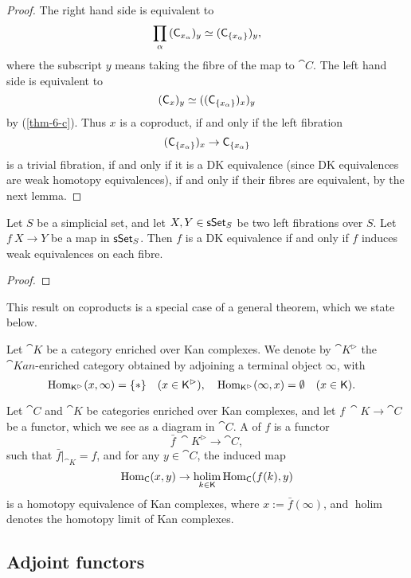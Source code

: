 \begin{proof}
    The right hand side is equivalent to  
    \[ \prod_\alpha{}(\mathsf{C}_{x_\alpha\/})_y
    \simeq (\mathsf{C}_{\{x_\alpha\}\/})_y, \]
    where the subscript $y$ means taking the fibre of the map to $\cat C$.
    The left hand side is equivalent to 
    \[ (\mathsf{C}_{x\/})_y\simeq((\mathsf{C}_{\{x_\alpha\}\/})_{x\/})_y \]
    by (\ref{thm-6-c}). Thus $x$ is a coproduct, if and only if the left fibration
    \[(\mathsf{C}_{\{x_\alpha\}\/})_{x\/}\to\mathsf{C}_{\{x_\alpha\}\/}\]
    is a trivial fibration,
    if and only if it is a DK equivalence (since DK equivalences are weak homotopy equivalences),
    if and only if their fibres are equivalent, by the next lemma.
\end{proof}

\begin{lemma}
    Let $S$ be a simplicial set, and let $X,Y\in\mathsf{sSet}_{\/S}$
    be two left fibrations over $S$.
    Let $f\:X\to Y$ be a map in $\mathsf{sSet}_{\/S}$.
    Then $f$ is a DK equivalence if and only if 
    $f$ induces weak equivalences on each fibre.
\end{lemma}

\begin{proof}
    \nyw
\end{proof}

This result on coproducts is a special case of a general theorem,
which we state below.

Let $\cat K$ be a category enriched over Kan complexes.
We denote by $\cat K^\vartriangleright$ the $\cat{Kan}$-enriched category obtained
by adjoining a terminal object $\infty$, with 
\[ \operatorname{Hom}_{\mathsf{K}^\vartriangleright}(x,\infty)=\{*\}\quad(x\in\mathsf{K}^\vartriangleright),\quad
\operatorname{Hom}_{\mathsf{K}^\vartriangleright}(\infty,x)=\emptyset\quad(x\in\mathsf{K}).\quad  \]

\begin{definition}
    Let $\cat C$ and $\cat K$ be categories enriched over Kan complexes,
    and let $f\:\cat K\to\cat C$ be a functor, which we see as a diagram in $\cat C$.
    A  of $f$ is a functor 
    \[ \bar f\:\cat K^\vartriangleright\to\cat C, \]
    such that $\bar f|_{\cat K}=f$, and for any $y\in\cat C$, the induced map 
    \[ \operatorname{Hom}_{\mathsf{C}}(x,y)\to\mathop{\operatorname{holim}}\limits_{k\in\mathsf{K}}\operatorname{Hom}_{\mathsf{C}}(f(k),y) \]
    is a homotopy equivalence of Kan complexes,
    where $x:=\bar f(\infty)$, and $\operatorname{holim}$ denotes the homotopy limit of Kan complexes.
\end{definition}

\tbc

\subsection{Adjoint functors}

\nyw

